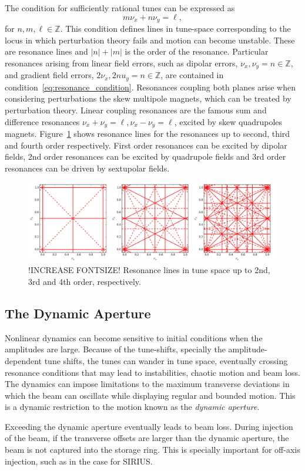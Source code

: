 The condition for sufficiently rational tunes can be expressed as
\begin{equation}
        m\nu_x + n\nu_y = \ell,
        \label{eq:resonance_condition}
\end{equation}
    for $n, m, \ell\in\mathbb{Z}$. This condition defines lines in tune-space corresponding to the locus in which perturbation theory fails and motion can become unstable. These are resonance lines and $|n|+|m|$ is the order of the resonance. Particular resonances arising from linear field errors, such as dipolar errors, $\nu_x, \nu_y = n\in\mathbb{Z}$, and gradient field errors, $2\nu_x, 2nu_y = n\in\mathbb{Z}$, are contained in condition~\eqref{eq:resonance_condition}. Resonances coupling both planes arise when considering perturbations the skew multipole magnets, which can be treated by perturbation theory. Linear coupling resonances are the famous sum and difference resonances $\nu_x + \nu_y = \ell, \nu_x - \nu_y = \ell$, excited by skew quadrupoles magnets.
    Figure~\ref{resons} shows resonance lines for the resonances up to second, third and fourth order respectively. First order resonances can be excited by dipolar fields, 2nd order resonances can be excited by quadrupole fields and 3rd order resonances can be driven by sextupolar fields.
\begin{figure}[thb]
    \centering
    \includegraphics[width=\textwidth]{Images/tunes.png}
    \caption[Resonance lines in tune space up to 2nd, 3rd and 4th order.]{!INCREASE FONTSIZE! Resonance lines in tune space up to 2nd, 3rd and 4th order, respectively.}
    \label{resons}
\end{figure}
\subsection{The Dynamic Aperture}
    Nonlinear dynamics can become sensitive to initial conditions when the amplitudes are large. Because of the tune-shifts, specially the amplitude-dependent tune shifts, the tunes can wander in tune space, eventually crossing resonance conditions that may lead to instabilities, chaotic motion and beam loss. The dynamics can impose limitations to the maximum transverse deviations in which the beam can oscillate while displaying regular and bounded motion. This is a dynamic restriction to the motion known as the \textit{dynamic aperture}.

    Exceeding the dynamic aperture eventually leads to beam loss. During injection of the beam, if the transverse offsets are larger than the dynamic aperture, the beam is not captured into the storage ring. This is specially important for off-axis injection, such as in the case for SIRIUS.

